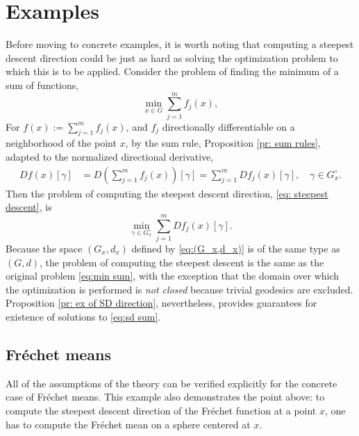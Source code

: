 \documentclass{article}
\theoremstyle{plain}\newtheorem{theorem}{Theorem}[section]
\theoremstyle{plain}\newtheorem{definition}[theorem]{Definition}
\theoremstyle{plain}\newtheorem{lemma}[theorem]{Lemma}
\theoremstyle{definition}\newtheorem{remark}[theorem]{Remark}
\theoremstyle{definition}\newtheorem{example}[theorem]{Example}
\theoremstyle{plain}\newtheorem{proposition}[theorem]{Proposition}
\theoremstyle{plain}\newtheorem{inference}[theorem]{Inference}
\theoremstyle{plain}\newtheorem{corollary}[theorem]{Corollary}
\theoremstyle{plain}\newtheorem{assumption}[theorem]{Assumption}
\renewcommand{\equiv}{:=}
\begin{document}
\section{Examples}\label{s:examples}
Before moving to concrete examples, it is worth noting that computing a steepest descent direction could be
just as hard as solving the optimization problem to which this is to be applied.
Consider the problem of finding the minimum of a sum of functions,
\begin{equation}\label{eq:min sum}
 \min_{x\in G}\sum_{j=1}^m f_j(x),
\end{equation}
For $f(x)\equiv \sum_{j=1}^m f_j(x)$, and $f_j$ directionally
differentiable on a neighborhood of the point $x$,
by the sum rule, Proposition \ref{pr: sum rules}, adapted to the normalized directional derivative, 
\begin{equation}\begin{aligned}
                    Df(x)[\gamma] &= D\left(\sum_{j=1}^m f_j(x)\right)[\gamma]=\sum_{j=1}^m Df_j(x)[\gamma],\quad \gamma\in G_x^\circ.
                \end{aligned}
\end{equation}
Then the problem of computing the steepest descent direction, \eqref{eq: steepest descent}, is
\begin{equation}\label{eq:sd sum}
 \min_{\gamma\in G_x^\circ}\sum_{j=1}^m Df_j(x)[\gamma].
\end{equation}
Because the space $(G_x, d_x)$ defined by \eqref{eq:(G_x,d_x)} is of the same type as $(G, d)$,
the problem of computing the steepest descent is the same as the original problem \eqref{eq:min sum},
with the exception that the domain over which the optimization is performed is {\em not closed} because trivial geodesics are excluded.
Proposition \ref{pr: ex of SD direction}, nevertheless, provides guarantees for existence of solutions to \eqref{eq:sd sum}.

\subsection{Fr\'echet means}
All of the assumptions of the theory can be verified explicitly for the concrete case of Fr\'echet means.  
This example also demonstrates the point above:  to compute the steepest descent direction of the Fr\'echet 
function at a point $x$, one has to compute the Fr\'echet mean on a sphere centered at $x$.  
\end{document}

